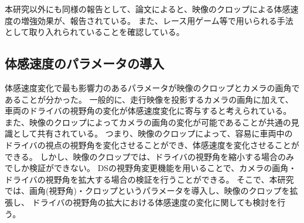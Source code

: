 本研究以外にも同様の報告として、論文によると、映像のクロップによる体感速度の増強効果が、報告されている。
また、レース用ゲーム等で用いられる手法として取り入れられていることを確認している。

\clearpage

\subsection{体感速度のパラメータの導入}
体感速度変化で最も影響力のあるパラメータが映像のクロップとカメラの画角であることが分かった。
一般的に、走行映像を投影するカメラの画角に加えて、車両のドライバの視野角の変化が体感速度変化に寄与すると考えられている。
また、映像のクロップによってカメラの画角の変化が可能であることが共通の見識として共有されている。
つまり、映像のクロップによって、容易に車両中のドライバの視点の視野角を変化させることができ、体感速度を変化させることができる。
しかし、映像のクロップでは、ドライバの視野角を縮小する場合のみでしか検証ができない。
DSの視野角変更機能を用いることで、カメラの画角・ドライバの視野角を拡大する場合の検証を行うことができる。
そこで、本研究では、画角(視野角)・クロップというパラメータを導入し、映像のクロップを拡張し、
ドライバの視野角の拡大における体感速度の変化に関しても検討を行う。

